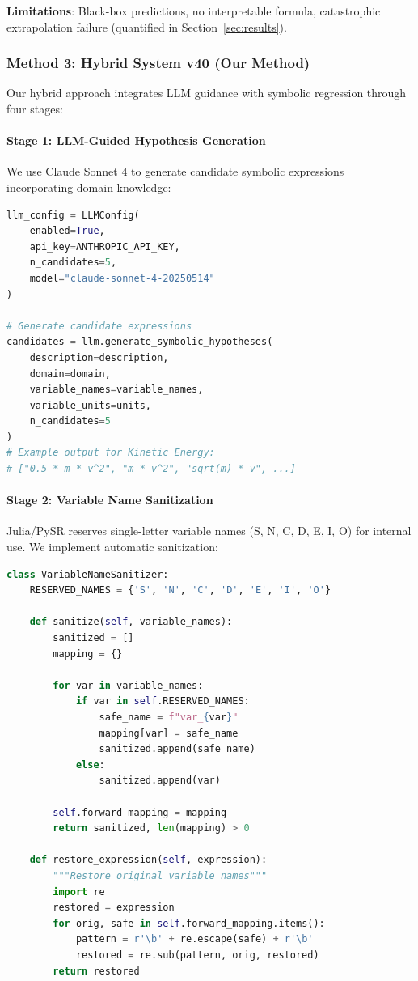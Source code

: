 \textbf{Limitations}: Black-box predictions, no interpretable formula, catastrophic extrapolation failure (quantified in Section~\ref{sec:results}).


\subsubsection{Method 3: Hybrid System v40 (Our Method)}

Our hybrid approach integrates LLM guidance with symbolic regression through four stages:

\paragraph{Stage 1: LLM-Guided Hypothesis Generation}

We use Claude Sonnet 4 to generate candidate symbolic expressions incorporating domain knowledge:

\begin{lstlisting}[language=Python, caption=LLM Hypothesis Generation]
llm_config = LLMConfig(
    enabled=True,
    api_key=ANTHROPIC_API_KEY,
    n_candidates=5,
    model="claude-sonnet-4-20250514"
)

# Generate candidate expressions
candidates = llm.generate_symbolic_hypotheses(
    description=description,
    domain=domain,
    variable_names=variable_names,
    variable_units=units,
    n_candidates=5
)
# Example output for Kinetic Energy:
# ["0.5 * m * v^2", "m * v^2", "sqrt(m) * v", ...]
\end{lstlisting}

\paragraph{Stage 2: Variable Name Sanitization}

Julia/PySR reserves single-letter variable names (S, N, C, D, E, I, O) for internal use. We implement automatic sanitization:

\begin{lstlisting}[language=Python, caption=Variable Name Sanitization]
class VariableNameSanitizer:
    RESERVED_NAMES = {'S', 'N', 'C', 'D', 'E', 'I', 'O'}

    def sanitize(self, variable_names):
        sanitized = []
        mapping = {}

        for var in variable_names:
            if var in self.RESERVED_NAMES:
                safe_name = f"var_{var}"
                mapping[var] = safe_name
                sanitized.append(safe_name)
            else:
                sanitized.append(var)

        self.forward_mapping = mapping
        return sanitized, len(mapping) > 0

    def restore_expression(self, expression):
        """Restore original variable names"""
        import re
        restored = expression
        for orig, safe in self.forward_mapping.items():
            pattern = r'\b' + re.escape(safe) + r'\b'
            restored = re.sub(pattern, orig, restored)
        return restored
\end{lstlisting}

